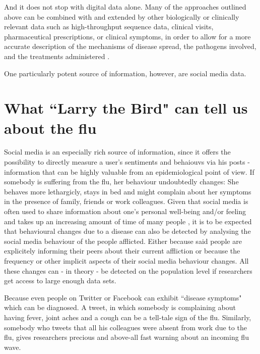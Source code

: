 \documentclass[11pt, a4paper]{report}\usepackage[]{graphicx}\usepackage[]{color}
\begin{document}
And it does not stop with digital data alone. Many of the approaches outlined above can be combined with and extended by other biologically or clinically relevant data such as high-throughput sequence data, clinical visits, pharmaceutical prescriptions, or clinical symptoms, in order to allow for a more accurate description of the mechanisms of disease spread, the pathogens involved, and the treatments administered \citep{ray_network_2016}.

One particularly potent source of information, however, are social media data.\newline

\section{What ``Larry the Bird" can tell us about the flu}

Social media is an especially rich source of information, since it offers the possibility to directly measure a user's sentiments and behaiouvs via his posts - information that can be highly valuable from an epidemiological point of view. If somebody is suffering from the flu, her behaviour undoubtedly changes: She behaves more lethargicly, stays in bed and might complain about her symptoms in the presence of family, friends or work colleagues. Given that social media is often used to share information about one's personal well-being and/or feeling and takes up an increasing amount of time of many people \citep{scott_time_2017,asano_socialmediatime_2017,bauer_timeonline_2016}, it is to be expected that behavioural changes due to a disease can also be detected by analysing the social media behaviour of the people afflicted. Either because said people are explicitely informing their peers about their current affliction or because the frequency or other implicit aspects of their social media behaviour changes. All these changes can - in theory - be detected on the population level if researchers get access to large enough data sets. 

Because even people on Twitter or Facebook can exhibit ``disease symptoms" which can be diagnosed. A tweet, in which somebody is complaining about having fever, joint aches and a cough can be a tell-tale sign of the flu. Similarly, somebody who tweets that all his colleagues were absent from work due to the flu, gives researchers precious and above-all fast warning about an incoming flu wave.\newline
\end{document}
